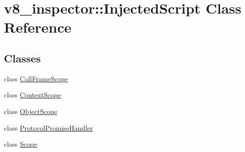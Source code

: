 \hypertarget{classv8__inspector_1_1InjectedScript}{}\section{v8\+\_\+inspector\+:\+:Injected\+Script Class Reference}
\label{classv8__inspector_1_1InjectedScript}
\subsection*{Classes}
\begin{DoxyCompactItemize}
\item 
class \mbox{\hyperlink{classv8__inspector_1_1InjectedScript_1_1CallFrameScope}{Call\+Frame\+Scope}}
\item 
class \mbox{\hyperlink{classv8__inspector_1_1InjectedScript_1_1ContextScope}{Context\+Scope}}
\item 
class \mbox{\hyperlink{classv8__inspector_1_1InjectedScript_1_1ObjectScope}{Object\+Scope}}
\item 
class \mbox{\hyperlink{classv8__inspector_1_1InjectedScript_1_1ProtocolPromiseHandler}{Protocol\+Promise\+Handler}}
\item 
class \mbox{\hyperlink{classv8__inspector_1_1InjectedScript_1_1Scope}{Scope}}
\end{DoxyCompactItemize}

